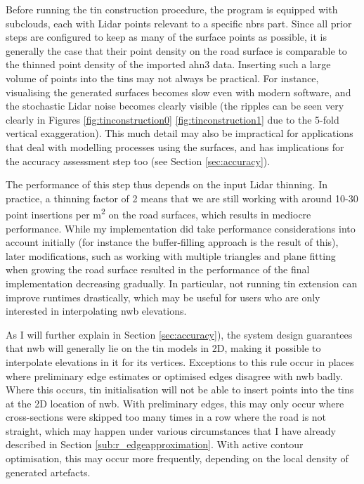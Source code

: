 Before running the \ac{tin} construction procedure, the program is equipped with subclouds, each with Lidar points relevant to a specific \ac{nbrs} part. Since all prior steps are configured to keep as many of the surface points as possible, it is generally the case that their point density on the road surface is comparable to the thinned point density of the imported \ac{ahn3} data. Inserting such a large volume of points into the \ac{tin}s may not always be practical. For instance, visualising the generated surfaces becomes slow even with modern software, and the stochastic Lidar noise becomes clearly visible (the ripples can be seen very clearly in Figures \ref{fig:tinconstruction0} \ref{fig:tinconstruction1} due to the 5-fold vertical exaggeration). This much detail may also be impractical for applications that deal with modelling processes using the surfaces, and has implications for the accuracy assessment step too (see Section \ref{sec:accuracy}).

The performance of this step thus depends on the input Lidar thinning. In practice, a thinning factor of 2 means that we are still working with around 10-30 point insertions per m\textsuperscript{2} on the road surfaces, which results in mediocre performance. While my implementation did take performance considerations into account initially (for instance the buffer-filling approach is the result of this), later modifications, such as working with multiple triangles and plane fitting when growing the road surface resulted in the performance of the final implementation decreasing gradually. In particular, not running \ac{tin} extension can improve runtimes drastically, which may be useful for users who are only interested in interpolating \ac{nwb} elevations.

As I will further explain in Section \ref{sec:accuracy}), the system design guarantees that \ac{nwb} will generally lie on the \ac{tin} models in 2D, making it possible to interpolate elevations in it for its vertices. Exceptions to this rule occur in places where preliminary edge estimates or optimised edges disagree with \ac{nwb} badly. Where this occurs, \ac{tin} initialisation will not be able to insert points into the \ac{tin}s at the 2D location of \ac{nwb}. With preliminary edges, this may only occur where cross-sections were skipped too many times in a row where the road is not straight, which may happen under various circumstances that I have already described in Section \ref{sub:r_edgeapproximation}. With active contour optimisation, this may occur more frequently, depending on the local density of generated artefacts.

